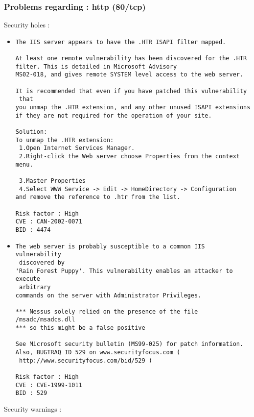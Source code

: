 \documentclass{article}
\begin{document}
\subsubsection{Problems regarding : http (80/tcp)}
Security holes :\\
\begin{itemize}
\item \begin{verbatim}
The IIS server appears to have the .HTR ISAPI filter mapped.

At least one remote vulnerability has been discovered for the .HTR
filter. This is detailed in Microsoft Advisory
MS02-018, and gives remote SYSTEM level access to the web server. 

It is recommended that even if you have patched this vulnerability
 that
you unmap the .HTR extension, and any other unused ISAPI extensions
if they are not required for the operation of your site.

Solution: 
To unmap the .HTR extension:
 1.Open Internet Services Manager. 
 2.Right-click the Web server choose Properties from the context menu.
 
 3.Master Properties 
 4.Select WWW Service -> Edit -> HomeDirectory -> Configuration 
and remove the reference to .htr from the list.

Risk factor : High
CVE : CAN-2002-0071
BID : 4474
\end{verbatim}\item \begin{verbatim}
The web server is probably susceptible to a common IIS vulnerability
 discovered by
'Rain Forest Puppy'. This vulnerability enables an attacker to execute
 arbitrary
commands on the server with Administrator Privileges. 

*** Nessus solely relied on the presence of the file /msadc/msadcs.dll
*** so this might be a false positive

See Microsoft security bulletin (MS99-025) for patch information.
Also, BUGTRAQ ID 529 on www.securityfocus.com (
 http://www.securityfocus.com/bid/529 )

Risk factor : High
CVE : CVE-1999-1011
BID : 529
\end{verbatim}\end{itemize}
Security warnings :\\
\end{document}

